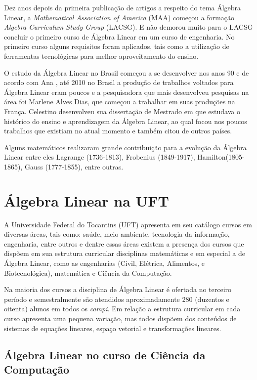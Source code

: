 Dez anos depois da primeira publicação de artigos a respeito do tema Álgebra Linear, a \textit{Mathematical Association of America} (MAA) começou a formação \textit{Algebra Curriculum Study Group} (LACSG). E não demorou muito para o LACSG concluir o primeiro curso de Álgebra Linear em um curso de engenharia. No primeiro curso alguns requisitos foram aplicados, tais como a utilização de ferramentas tecnológicas para melhor aproveitamento do ensino.

O estudo da Álgebra Linear no Brasil começou a se desenvolver nos anos 90 e de acordo com Ana \cite{2010:furtado}, até 2010 no Brasil a produção de trabalhos voltados para Álgebra Linear eram poucos e a pesquisadora que mais desenvolveu pesquisas na área foi Marlene Alves Dias, que começou a trabalhar em suas produções na França. Celestino \cite{2000:celestino} desenvolveu sua dissertação de Mestrado em que estudava o histórico do ensino e aprendizagem da Álgebra Linear, ao qual focou nos poucos trabalhos que existiam no atual momento e também citou de outros países.

Alguns matemáticos realizaram grande contribuição para a evolução da Álgebra Linear entre eles Lagrange (1736-1813), Frobenius (1849-1917), Hamilton(1805-1865), Gauss (1777-1855), entre outras.

\section{Álgebra Linear na UFT}

\noindent A Universidade Federal do Tocantins (UFT) apresenta em seu catálogo cursos em diversas áreas, tais como: saúde, meio ambiente, tecnologia da informação, engenharia, entre outros e dentre essas áreas existem a presença dos cursos que dispõem em sua estrutura curricular disciplinas matemáticas e em especial a de Álgebra Linear, como as engenharias (Civil, Elétrica, Alimentos, e Biotecnológica), matemática e Ciência da Computação.

Na maioria dos cursos a disciplina de Álgebra Linear é ofertada no terceiro período e semestralmente são atendidos aproximadamente 280 (duzentos e oitenta) alunos em todos os \textit{campi}. Em relação a estrutura curricular em cada curso apresenta uma pequena variação, mas todos dispõem dos conteúdos de sistemas de equações lineares, espaço vetorial e transformações lineares.

\subsection{Álgebra Linear no curso de Ciência da Computação}

